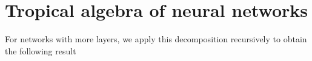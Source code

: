 \documentclass{article}
\theoremstyle{definition}
\newtheorem{comment}[theorem]{Comment}
\begin{document}

\newpage

\section{Tropical algebra of neural networks}\label{sec:trop_netw}

For networks with more layers, we apply this decomposition recursively to obtain the following result
\end{document}

